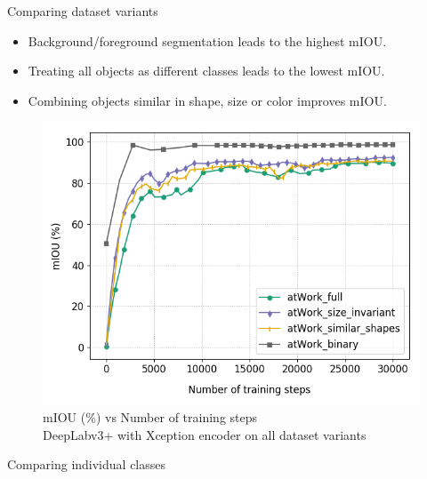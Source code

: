 \documentclass{beamer}
\begin{document}
\begin{frame}{Comparing dataset variants}
	
	\begin{itemize}
		\item Background/foreground segmentation leads to the highest mIOU.
		\item Treating all objects as different classes leads to the lowest mIOU.
		\item Combining objects similar in shape, size or color improves mIOU.
	\end{itemize}
	
	\begin{figure}[h]
		\centering
		\includegraphics[width=0.4\linewidth]{images/xcep_4vars}
		\captionsetup{justification=centering,margin=2cm}
		\caption{mIOU (\%) vs Number of training steps \\ DeepLabv3+ with Xception encoder on all dataset variants}
		\label{Fig:variants}
	\end{figure}

\end{frame}


%
%


\begin{frame}{Comparing individual classes}


\end{frame}
\end{document}
